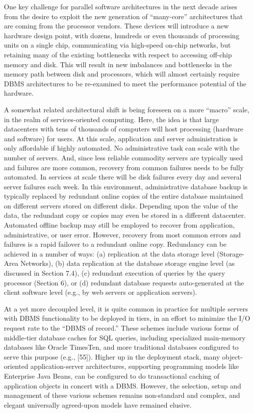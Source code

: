 \documentclass[b5paper,11pt,twoside,openright]{book}
\begin{document}
One key challenge for parallel software architectures in the next decade
arises from the desire to exploit the new generation of ``many-core''
architectures that are coming from the processor vendors. These devices
will introduce a new hardware design point, with dozens, hundreds or
even thousands of processing units on a single chip, communicating via
high-speed on-chip networks, but retaining many of the existing
bottlenecks with respect to accessing off-chip memory and disk. This
will result in new imbalances and bottlenecks in the memory path between
disk and processors, which will almost certainly require DBMS
architectures to be re-examined to meet the performance potential of the
hardware.

A somewhat related architectural shift is being foreseen on a more
``macro'' scale, in the realm of services-oriented computing. Here, the
idea is that large datacenters with tens of thousands of computers will
host processing (hardware and software) for users. At this scale,
application and server administration is only affordable if highly
automated. No administrative task can scale with the number of servers.
And, since less reliable commodity servers are typically used and
failures are more common, recovery from common failures needs to be
fully automated. In services at scale there will be disk failures every
day and several server failures each week. In this environment,
administrative database backup is typically replaced by redundant online
copies of the entire database maintained on different servers stored on
different disks. Depending upon the value of the data, the redundant
copy or copies may even be stored in a different datacenter. Automated
offline backup may still be employed to recover from application,
administrative, or user error. However, recovery from most common errors
and failures is a rapid failover to a redundant online copy. Redundancy
can be achieved in a number of ways: (a) replication at the data storage
level (Storage-Area Networks), (b) data replication at the database
storage engine level (as discussed in Section 7.4), (c) redundant
execution of queries by the query processor (Section 6), or (d)
redundant database requests auto-generated at the client software level
(e.g., by web servers or application servers).

At a yet more decoupled level, it is quite common in practice for
multiple servers with DBMS functionality to be deployed in tiers, in an
effort to minimize the I/O request rate to the ``DBMS of record.'' These
schemes include various forms of middle-tier database caches for SQL
queries, including specialized main-memory databases like Oracle
TimesTen, and more traditional databases configured to serve this
purpose (e.g., {[}55{]}). Higher up in the deployment stack, many
object-oriented application-server architectures, supporting programming
models like Enterprise Java Beans, can be configured to do transactional
caching of application objects in concert with a DBMS. However, the
selection, setup and management of these various schemes remains
non-standard and complex, and elegant universally agreed-upon models
have remained elusive.
\end{document}

